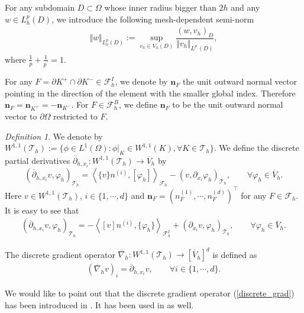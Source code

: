 \documentclass[12pt]{amsart}
\theoremstyle{definition}
\theoremstyle{remark}
\newtheorem{definition}[theorem]{Definition}
\begin{document}
For any subdomain $D\subset \Omega$ whose inner radius bigger than $2h$ and any $w \in L_{h}^{p}(D)$, we 
introduce the following mesh-dependent semi-norm 
\begin{align}
\label{discrete_zero_order_norm}
\Vert w\Vert_{L_{h}^{p}(D)}:= \sup_{v_{h} \in V_{h}(D)} \dfrac{(w, v_{h})_{D}}{\Vert v_{h}
\Vert_{L^{p^{\prime}}(D)}},
\end{align} 
where $\frac{1}{p} + \frac{1}{p^{\prime}} = 1$.

For any $F = \partial K^{+}\cap \partial K^{-} \in \mathcal{F}_{h}^{I}$, we denote by $\boldsymbol{n}_{F}$ 
the unit outward normal vector pointing in the direction of the element with the smaller global index.  
Therefore $\boldsymbol{n}_{F} = \boldsymbol{n}_{K^{+}} = - \boldsymbol{n}_{K^{-}}$. For $F \in \mathcal{F}_{h}^{B}$, 
we define $\boldsymbol{n}_{F}$ to be the unit outward normal vector to $\partial\Omega$ restricted to $F$.

\begin{definition}
\label{def_discrete_deri}
We denote by $W^{1,1}(\mathcal{T}_{h}):= \{\phi \in L^{1}(\Omega): \phi|_{K} \in W^{1,1}(K), \forall K \in\mathcal{T}_{h}\}$.  
We define the discrete partial derivatives $\overline{\partial}_{h, x_{i}}: W^{1,1}(\mathcal{T}_{h}) \rightarrow 
\overline{V}_{h}$ by 
\begin{equation}
	\label{discrete_deri}
	(\overline{\partial}_{h,x_{i}}v,\varphi_{h})_{\mathcal{T}_{h}}=\left\langle \{ v \} n^{(i)}, [\varphi_{h}] 
	\right\rangle_{\mathcal{F}_{h}}-(v,\partial_{x_{i}}\varphi_{h})_{\mathcal{T}_h}, \qquad 
	\forall \varphi_{h} \in \overline{V}_{h}.  
\end{equation} 
Here $v \in W^{1,1}(\mathcal{T}_{h})$, $i \in \{1,\cdots, d\}$ and $\boldsymbol{n}_{F} 
= ( n_{F}^{(1)},\cdots, n_{F}^{(d)})^{\top}$ for any $F \in \mathcal{F}_{h}$. 
It is easy to see that 
\begin{align}
\label{discrete_deri_equivalent}
	(\overline{\partial}_{h,x_{i}}v,\varphi_{h})_{\mathcal{T}_{h}}=- \left\langle [ v ] n^{(i)}, \{\varphi_{h}\} 
	\right\rangle_{\mathcal{F}_{h}^{I}} + (\partial_{x_{i}}v,\varphi_{h})_{\mathcal{T}_h}, \qquad 
	\forall \varphi_{h} \in \overline{V}_{h}.
\end{align}

The discrete gradient operator $\overline{\nabla}_{h}: W^{1,1}(\mathcal{T}_{h}) \rightarrow [\overline{V}_{h}]^{d}$ 
is defined as 
\begin{align}
\label{discrete_grad}
\left( \overline{\nabla}_{h} v\right)_{i} = \overline{\partial}_{h, x_{i}}v, \qquad \forall i \in \{1,\cdots, d\}.
\end{align}
\end{definition}
We would like to point out that the discrete gradient operator (\ref{discrete_grad}) 
has been introduced in \cite{LakkisPryer2011}. It has been used in \cite{BHW2021,DednerPryer2022,FLW2022} as well.
\end{document}
